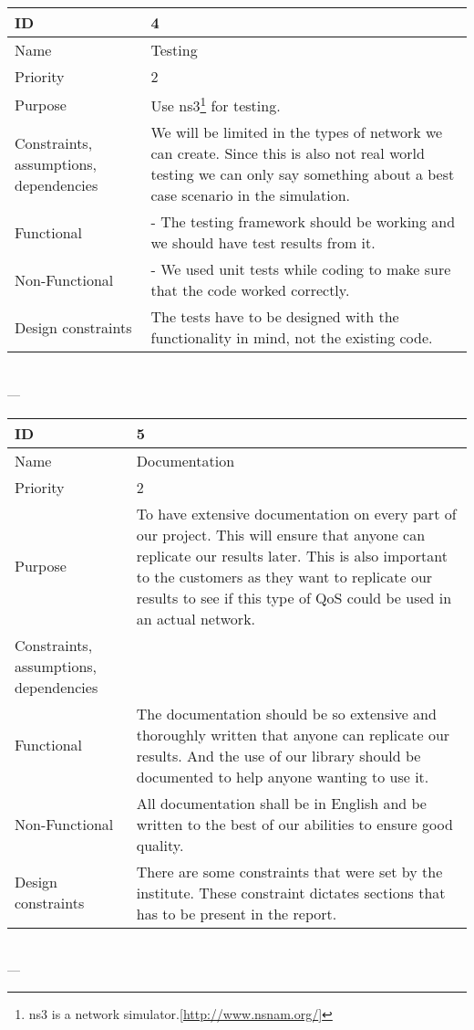 \begin{center}
    \begin{tabular}{| p{4cm} | p{8cm} |}
        \hline
        ID & 4 \\
        \hline
        Name & Testing  \\
        \hline
        Priority & 2 \\
        \hline
        Purpose & Use \gls{ns3}\footnote{\gls{ns3} is a network simulator.[\url{http://www.nsnam.org/}]} for testing. \\
        \hline 
        Constraints, assumptions, dependencies & We will be limited in the types of network we can create. Since this is also not real world testing we can only say something about a best case scenario in the simulation.\\
        \hline  
        Functional & - The testing framework should be working and we should have test results from it.\\
        \hline
        Non-Functional & - We used unit tests while coding to make sure that the code worked correctly. \\ 
        \hline
        Design constraints & The tests have to be designed with the functionality in mind, not the existing code. \\
        \hline
    \end{tabular}
    \\  ---  \\
    
    \begin{tabular}{| p{4cm} | p{8cm} |}
        \hline
        ID & 5 \\
        \hline
        Name & Documentation  \\
        \hline
        Priority & 2 \\
        \hline
        Purpose & To have extensive documentation on every part of our project. This will ensure that anyone can replicate our results later. This is also important to the customers as they want to replicate our results to see if this type of QoS could be used in an actual network.\\
        \hline 
        Constraints, assumptions, dependencies &  \\
        \hline  
        Functional & The documentation should be so extensive and thoroughly written that anyone can replicate our results. And the use of our library should be documented to help anyone wanting to use it. \\
        \hline
        Non-Functional & All documentation shall be in English and be written to the best of our abilities to ensure good quality. \\ 
        \hline
        Design constraints & There are some constraints that were set by the institute. These constraint dictates sections that has to be present in the report. \\
        \hline
    \end{tabular}
    \\  ---  \\
    

\end{center}
